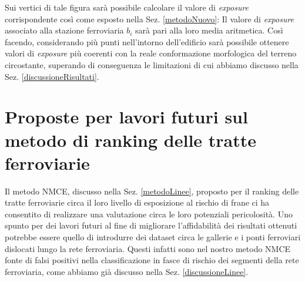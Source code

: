 Sui vertici di tale figura sarà possibile calcolare il valore di \textit{exposure} corrispondente così come esposto nella Sez. \ref{metodoNuovo}: Il valore di \textit{exposure} associato alla stazione ferroviaria \textit{$b_i$} sarà pari alla loro media aritmetica.
Così facendo, considerando più punti nell'intorno dell'edificio sarà possibile ottenere valori di \textit{exposure} più coerenti con la reale conformazione morfologica del terreno circostante, superando di conseguenza le limitazioni di cui abbiamo discusso nella Sez. \ref{discussioneRisultati}.
 
\section{Proposte per lavori futuri sul metodo di ranking delle tratte ferroviarie}
Il metodo NMCE, discusso nella Sez. \ref{metodoLinee}, proposto per il ranking delle tratte ferroviarie circa il loro livello di esposizione al rischio di frane ci ha consentito di realizzare una valutazione circa le loro potenziali pericolosità. Uno spunto per dei lavori futuri al fine di migliorare l'affidabilità dei risultati ottenuti potrebbe essere quello di introdurre dei dataset circa le gallerie e i ponti ferroviari dislocati lungo la rete ferroviaria. Questi infatti sono nel nostro metodo NMCE fonte di falsi positivi nella classificazione in fasce di rischio dei segmenti della rete ferroviaria, come abbiamo già discusso nella Sez. \ref{discussioneLinee}.
